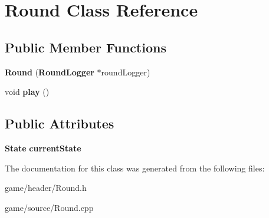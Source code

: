 \section{Round Class Reference}
\label{class_round}
\subsection*{Public Member Functions}
\begin{DoxyCompactItemize}
\item 
{\bfseries Round} ({\bf Round\-Logger} $\ast$round\-Logger)\label{class_round_abbe52774d5d8aa3821fb98da60cfbb2c}

\item 
void {\bfseries play} ()\label{class_round_a5f82d0ce31d620c9e649fb5b565c79b4}

\end{DoxyCompactItemize}
\subsection*{Public Attributes}
\begin{DoxyCompactItemize}
\item 
{\bf State} {\bfseries current\-State}\label{class_round_ae453f02f4bf081afa39f79779cbb6577}

\end{DoxyCompactItemize}


The documentation for this class was generated from the following files\-:\begin{DoxyCompactItemize}
\item 
game/header/Round.\-h\item 
game/source/Round.\-cpp\end{DoxyCompactItemize}
